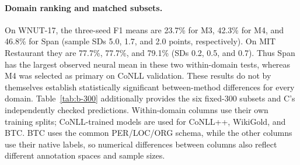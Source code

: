 \paragraph{Domain ranking and matched subsets.}
On WNUT-17, the three-seed F1 means are 23.7\% for M3, 42.3\% for M4,
and 46.8\% for Span (sample SDs 5.0, 1.7, and 2.0 points, respectively).
On MIT Restaurant they are 77.7\%, 77.7\%, and 79.1\% (SDs 0.2, 0.5,
and 0.7). Thus Span has the largest observed neural mean in these two
within-domain tests, whereas M4 was selected as primary on CoNLL validation.
These results do not by themselves establish statistically significant
between-method differences for every domain. Table~\ref{tab:b-300} additionally
provides the six fixed-300 subsets and C's independently checked predictions.
Within-domain columns use their own training splits; CoNLL-trained models are
used for CoNLL++, WikiGold, and BTC. BTC uses the common PER/LOC/ORG schema,
while the other columns use their native labels, so numerical differences
between columns also reflect different annotation spaces and sample sizes.

\begin{table}[t]
\centering
\caption{Entity F1 on the fixed 300-sentence subsets. The four lower rows are
C's previously generated predictions after checking IDs, configuration,
labels and scores against the fixed subsets. Few-shot Qwen uses ten retrieved
examples. Schemas and training sources differ across datasets; see text.}
\label{tab:b-300}
\resizebox{\linewidth}{!}{}
\end{table}

